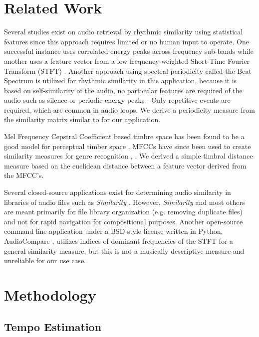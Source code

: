 \documentclass{article}
\begin{document}
\section{Related Work}

Several studies exist on audio retrieval by rhythmic similarity using statistical features since this approach requires limited or no human input to operate. One successful instance uses correlated energy peaks across frequency sub-bands \cite{scheirer1998tempo}  while another uses a feature vector from a low frequency-weighted Short-Time Fourier Transform (STFT) \cite{wold1999classification}. Another approach using spectral periodicity called the Beat Spectrum \cite{foote2001beat} is utilized for rhythmic similarity in this application, because it is based on self-similarity of the audio, no particular features are required of the audio such as silence or periodic energy peaks - Only repetitive events are required, which are common in audio loops. We derive a periodicity measure from the similarity matrix similar to \cite{foote2001beat} for our application.

Mel Frequency Cepstral Coefficient based timbre space has been found to be a good model for perceptual timber space \cite{terasawa2005thirteen}. MFCCs have since been used to create similarity measures \cite{jensen2009quantitative} for genre recognition \cite{levy2006lightweight}, \cite{jensen2006evaluation}. We derived a simple timbral distance measure based on the euclidean distance between a feature vector derived from the MFCC's.

Several closed-source applications exist for determining audio similarity in libraries of audio files such as \textit{Similarity} \cite{similarityapp}. However, \textit{Similarity} and most others are meant primarily for file library organization (e.g. removing duplicate files) and not for rapid navigation for compositional purposes. Another open-source command line application under a BSD-style license written in Python, AudioCompare \cite{audiocompare}, utilizes indices of dominant frequencies of the STFT for a general similarity measure, but this is not a musically descriptive measure and unreliable for our use case. 


\section{Methodology}

\subsection{Tempo Estimation}
\end{document}
